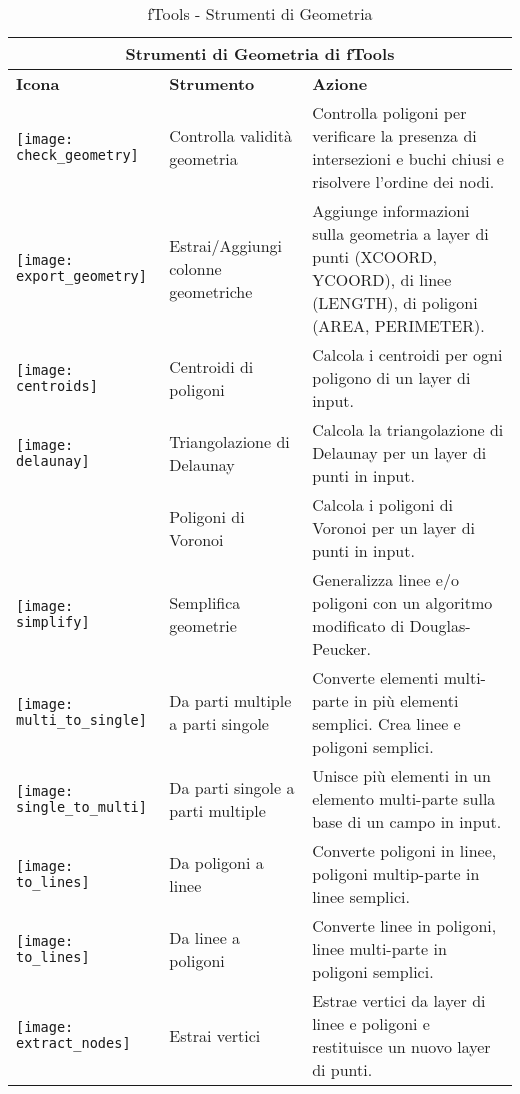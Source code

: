 \begin{table}[ht]
\centering
\begin{tabular}{|m{1cm}|m{3cm}|m{12cm}|}
 \hline \multicolumn{3}{|c|}{\textbf{Strumenti di Geometria di fTools}} \\
 \hline \textbf{Icona} & \textbf{Strumento} & \textbf{Azione} \\
 \hline \texttt{[image: check\_geometry]} & Controlla validità geometria & 
Controlla poligoni per verificare la presenza di intersezioni e buchi chiusi e 
risolvere l'ordine dei nodi. \\
 \hline \texttt{[image: export\_geometry]} & Estrai/Aggiungi colonne geometriche & 
Aggiunge informazioni sulla geometria a layer di punti (XCOORD, YCOORD), di linee
(LENGTH), di poligoni (AREA, PERIMETER). \\
 \hline \texttt{[image: centroids]} & Centroidi di poligoni & 
Calcola i centroidi per ogni poligono di un layer di input. \\
 \hline \texttt{[image: delaunay]} & Triangolazione di Delaunay & 
Calcola la triangolazione di Delaunay per un layer di punti in input. \\
 \hline  & Poligoni di Voronoi & 
Calcola i poligoni di Voronoi per un layer di punti in input. \\
 \hline \texttt{[image: simplify]} & Semplifica geometrie & 
Generalizza linee e/o poligoni con un algoritmo modificato di Douglas-Peucker. \\
 \hline \texttt{[image: multi\_to\_single]} & Da parti multiple a parti singole & 
Converte elementi multi-parte in più elementi semplici. Crea linee e poligoni semplici. \\
 \hline \texttt{[image: single\_to\_multi]} & Da parti singole a parti multiple & 
Unisce più elementi in un elemento multi-parte sulla base di un campo in input. \\
 \hline \texttt{[image: to\_lines]} & Da poligoni a linee & Converte 
poligoni in linee, poligoni multip-parte in linee semplici. \\
 \hline \texttt{[image: to\_lines]} & Da linee a poligoni & Converte 
linee in poligoni, linee multi-parte in poligoni semplici. \\
 \hline \texttt{[image: extract\_nodes]} & Estrai vertici & Estrae 
vertici  da layer di linee e poligoni e restituisce un nuovo layer di punti. \\
 \hline
\end{tabular}
\caption{fTools - Strumenti di Geometria}\label{tab:ftool_geometry}
\end{table}

